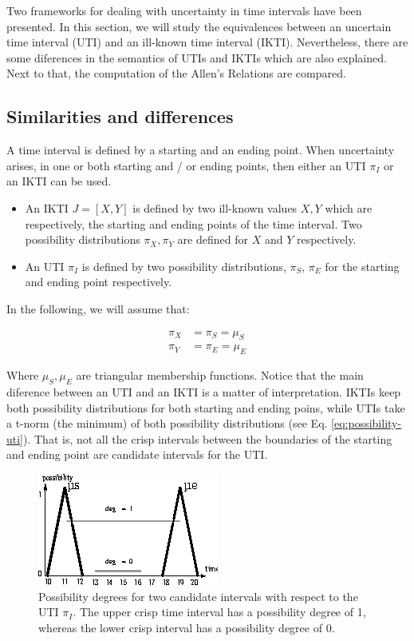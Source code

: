 Two frameworks for dealing with uncertainty in time intervals have been presented. In this section, we will study the equivalences between an uncertain time interval (UTI) and an ill-known time interval (IKTI). Nevertheless, there are some diferences in the semantics of UTIs and IKTIs which are also explained. Next to that, the computation of the Allen's Relations are compared.

\subsection{\label{subsec:sim-dif}Similarities and differences}
A time interval is defined by a starting and an ending point. When uncertainty arises, in one or both starting and / or ending points, then either an UTI $\pi_I$ or an IKTI can be used. 

\begin{itemize}
 \item An IKTI $J = \left[X, Y \right]$ is defined by two ill-known values $X, Y$ which are respectively, the starting and ending points of the time interval. Two possibility distributions $\pi_X, \pi_Y$ are defined for $X$ and $Y$ respectively.
\item An UTI $\pi_I$ is defined by two possibility distributions, $\pi_S$, $\pi_E$ for the starting  and ending point respectively.
\end{itemize}

In the following, we will assume that:

\begin{align}
\pi_X &= \pi_S = \mu_S \\
\pi_Y &= \pi_E = \mu_E
\end{align}

Where $\mu_S, \mu_E$ are triangular membership functions. Notice that the main diference between an UTI and an IKTI is a matter of interpretation. IKTIs  keep both possibility distributions for both starting and ending poins, while UTIs take a t-norm (the minimum) of both possibility distributions (see Eq. \eqref{eq:possibility-uti}). That is, not all the crisp intervals between the boundaries of the starting and ending point are candidate intervals for the UTI.

\begin{figure}[h]
   \centering
   \includegraphics[scale=1.5]{graphs/equivalences.eps}
   \caption{Possibility degrees for two candidate intervals with respect to the UTI $\pi_I$. The upper crisp time interval has a possibility degree of 1, whereas the lower crisp interval has a possibility degree of 0. }
   \label{fig:ikc-greater}
 \end{figure}

